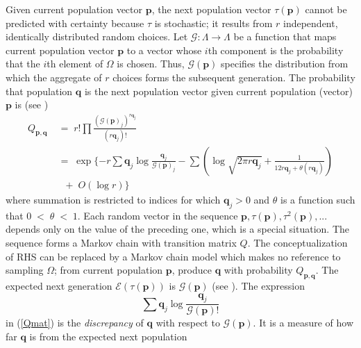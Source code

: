 Given current population vector $\bm{p}$, the next population vector $\tau(\bm{p})$ cannot 
be predicted with certainty because $\tau$ is stochastic; it results from $r$ independent, identically distributed random choices. 
Let $\mathcal{G}:\Lambda \rightarrow \Lambda$ be a function that maps 
current population vector $\bm{p}$ to a vector whose $i$th component 
is the probability that the $i$th element of $\Omega$ is chosen. Thus, $\mathcal{G}(\bm{p})$ 
specifies the distribution from which the aggregate 
of $r$ choices forms the subsequent generation. The probability that population $\bm{q}$ is 
the next population vector given current population (vector) $\bm{p}$ is (see \cite{Vose1999}) 
\begin{equation}
\label{Qmat}
\begin{split}
Q_{\bm{p},\bm{q}} & \;=\; r! \prod \frac{(\mathcal{G}(\bm{p})_j)^{r\bm{q}_j}}{(r\bm{q}_j)!} \\
& \;=\; \exp\{-r \sum \bm{q}_j \log \frac{\bm{q}_j}{\mathcal{G}(\bm{p})_j} - \sum (\log \sqrt{2 \pi r\bm{q}_j}  + \frac{1}{12r\bm{q}_j + \theta (r\bm{q}_j)}) \\      
& \;\;\; + \; O(\log r)\}
\end{split}
\end{equation}
where summation is restricted to indices for which $\bm{q}_j > 0$ and $\theta$ is a function such that $0 \;<\; \theta \;<\; 1$.
Each random vector in the sequence $\bm{p}, \tau(\bm{p}), \tau^2(\bm{p}),...$ depends only on the value of the preceding one, 
which is a special situation. The sequence forms a Markov chain with transition matrix $Q$. 
The conceptualization of RHS can be replaced by a Markov chain model which makes no reference to sampling $\Omega$; 
from current population $\bm{p}$, produce $\bm{q}$ with probability $Q_{\bm{p},\bm{q}}$. The expected next generation 
$\mathcal{E}(\tau (\bm{p}))$ is $\mathcal{G}(\bm{p})$ (see \cite{Vose1999}). The expression 
\[
\sum \bm{q}_j \log \frac{\bm{q}_j}{\mathcal{G}(\bm{p})!}
\]
in (\ref{Qmat}) is the {\em discrepancy} of $\bm{q}$ with respect to $\mathcal{G}(\bm{p})$. It is a measure of how far $\bm{q}$ is from the expected next population 
